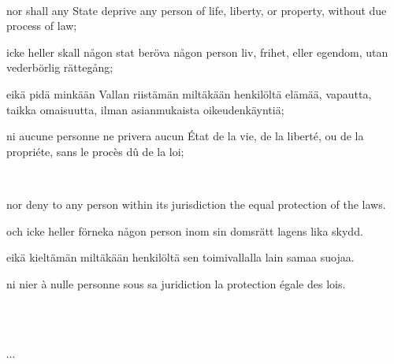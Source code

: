 \documentclass[a4,landscape,12pt]{article}
\begin{document}
~

\begin{minipage}[t]{0.22\textwidth}
nor shall any State deprive any person of life, liberty, or property, without due process of law;
\end{minipage}\textwidth
\begin{minipage}[t]{0.22\textwidth}
icke heller skall någon stat beröva någon person liv, frihet, eller egendom, utan vederbörlig rättegång;
\end{minipage}\textwidth
\begin{minipage}[t]{0.22\textwidth}
eikä pidä minkään Vallan riistämän miltäkään henkilöltä elämää, vapautta, taikka omaisuutta, ilman asianmukaista oikeudenkäyntiä;
\end{minipage}\textwidth
\begin{minipage}[t]{0.22\textwidth}
ni aucune personne ne privera aucun État de la vie, de la liberté, ou de la propriéte, sans le procès dû de la loi;
\end{minipage}
	
~

\begin{minipage}[t]{0.22\textwidth}
nor deny to any person within its jurisdiction the equal protection of the laws.
\end{minipage}\textwidth
\begin{minipage}[t]{0.22\textwidth}
och icke heller förneka någon person inom sin domsrätt lagens lika skydd.
\end{minipage}\textwidth
\begin{minipage}[t]{0.22\textwidth}
eikä kieltämän miltäkään henkilöltä sen toimivallalla lain samaa suojaa.
\end{minipage}\textwidth
\begin{minipage}[t]{0.22\textwidth}
ni nier à nulle personne sous sa juridiction la protection égale des lois.
\end{minipage}

~

~
		
$\cdots$
\end{document}
